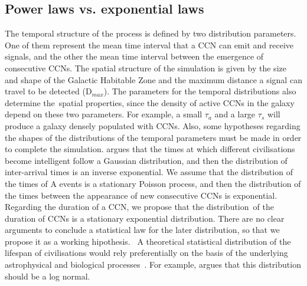 \documentclass[crop]{CSLB}
\newcommand{\ceti}{CCN}
\newcommand{\cetis}{CCNs}
\begin{document}
    

\subsection{Power laws vs. exponential laws}\label{SS_PDF_shape}

The temporal structure of the process is defined by two distribution parameters. One of them represent the mean time
interval that a \ceti{} can emit and receive signals, and the other the mean time interval between the emergence of
consecutive \cetis{}. The spatial structure of the simulation is given by the size and shape of the Galactic Habitable
Zone and the maximum distance a signal can travel to be detected (D$_{max}$). The parameters for the temporal
distributions also determine the spatial properties, since the density of active \cetis{} in the galaxy depend on these
two parameters. For example, a small $\tau_a$ and a large $\tau_s$ will produce a galaxy densely populated with
\cetis{}. Also, some hypotheses regarding the shapes of the distributions of the temporal parameters must be made in
order to complete the simulation. \citet{forgan_spatiotemporal_2011} argues that the times at which different
civilisations become intelligent follow a Gaussian distribution, and then the distribution of inter-arrival times is an
inverse exponential. We assume that the distribution of the times of A events is a stationary Poisson process, and then
the distribution of the times between the appearance of new consecutive \cetis{} is exponential. Regarding the duration
of a \ceti{}, we propose that the distribution of the duration of \cetis{} is a stationary exponential distribution.
There are no clear arguments to conclude a statistical law for the later distribution, so that we propose it as a
working hipothesis.  A theoretical statistical distribution of the lifespan of civilisations would rely preferentially
on the basis of the underlying astrophysical and biological processes \citep{balbi_impact_2018}. For example,
\citet{maccone_lognormals_2014} argues that this distribution should be a log normal. 
\end{document}
